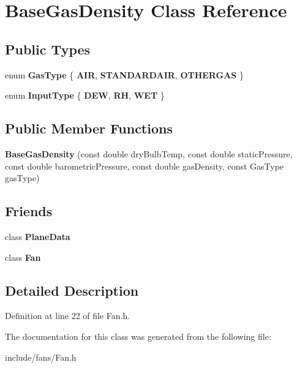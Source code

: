 \hypertarget{class_base_gas_density}{}\section{Base\+Gas\+Density Class Reference}
\label{class_base_gas_density}
\subsection*{Public Types}
\begin{DoxyCompactItemize}
\item 
\mbox{\label{class_base_gas_density_afb215e48f6193462521b7e8d47306ed3}} 
enum {\bfseries Gas\+Type} \{ {\bfseries A\+IR}, 
{\bfseries S\+T\+A\+N\+D\+A\+R\+D\+A\+IR}, 
{\bfseries O\+T\+H\+E\+R\+G\+AS}
 \}
\item 
\mbox{\label{class_base_gas_density_a54f846cc4683a49d3904a40fe2986772}} 
enum {\bfseries Input\+Type} \{ {\bfseries D\+EW}, 
{\bfseries RH}, 
{\bfseries W\+ET}
 \}
\end{DoxyCompactItemize}
\subsection*{Public Member Functions}
\begin{DoxyCompactItemize}
\item 
\mbox{\label{class_base_gas_density_a84089ddd9d29649d83a7b150b711b989}} 
{\bfseries Base\+Gas\+Density} (const double dry\+Bulb\+Temp, const double static\+Pressure, const double barometric\+Pressure, const double gas\+Density, const Gas\+Type gas\+Type)
\end{DoxyCompactItemize}
\subsection*{Friends}
\begin{DoxyCompactItemize}
\item 
\mbox{\label{class_base_gas_density_a28ff438eefb65e97bddb4051dd0a0112}} 
class {\bfseries Plane\+Data}
\item 
\mbox{\label{class_base_gas_density_a0a305abd4183ca4b5d3adb1b563378d7}} 
class {\bfseries Fan}
\end{DoxyCompactItemize}


\subsection{Detailed Description}


Definition at line 22 of file Fan.\+h.



The documentation for this class was generated from the following file\+:\begin{DoxyCompactItemize}
\item 
include/fans/Fan.\+h\end{DoxyCompactItemize}
